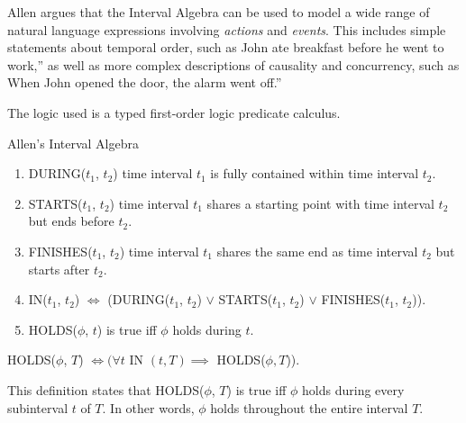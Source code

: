 Allen argues that the Interval Algebra can be used to model a wide range of natural language expressions involving \textit{actions} and \textit{events}. This includes simple statements about temporal order, such as John ate breakfast before he went to work,'' as well as more complex descriptions of causality and concurrency, such as When John opened the door, the alarm went off.''


\pagebreak
The logic used is a typed first-order logic predicate calculus.

\begin{exmp} Allen's Interval Algebra

\begin{enumerate}
  \item DURING($t_1$, $t_2$) time interval $t_1$ is fully contained within time interval $t_2$.

  \item STARTS($t_1$, $t_2$) time interval $t_1$ shares a starting point with time interval $t_2$ but ends before $t_2$.

  \item FINISHES($t_1$, $t_2$) time interval $t_1$ shares the same end as time interval $t_2$ but starts after $t_2$.

  \item IN($t_1$, $t_2$) $\iff$ (DURING($t_1$, $t_2$) $\lor$ STARTS($t_1$, $t_2$) $\lor$ FINISHES($t_1$, $t_2$)). 

  \item HOLDS(\(\phi\), \(t\)) is true iff \(\phi\) holds during \(t\).
\end{enumerate}



\begin{center}
  HOLDS(\(\phi\), \(T\)) \(\iff ( \forall t \) IN $ (t,T) \implies $ HOLDS($\phi, T $)).
\end{center}

This definition states that HOLDS($\phi$, $T$) is true iff $\phi$ holds during every subinterval $t$ of $T$. In other words, $\phi$ holds throughout the entire interval $T$.
\end{exmp}

